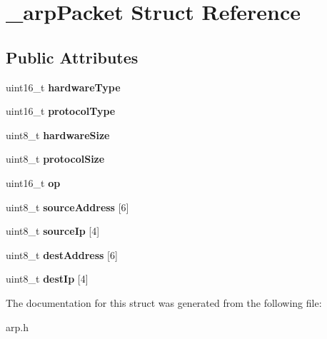 \hypertarget{struct__arpPacket}{}\section{\+\_\+arp\+Packet Struct Reference}
\label{struct__arpPacket}
\subsection*{Public Attributes}
\begin{DoxyCompactItemize}
\item 
\mbox{\label{struct__arpPacket_a839c94f50cb7173a20785682e441d948}} 
uint16\+\_\+t {\bfseries hardware\+Type}
\item 
\mbox{\label{struct__arpPacket_afad7356bbce2b911d8f6826872101e77}} 
uint16\+\_\+t {\bfseries protocol\+Type}
\item 
\mbox{\label{struct__arpPacket_a722bf3490b264b96540b94863c6a027d}} 
uint8\+\_\+t {\bfseries hardware\+Size}
\item 
\mbox{\label{struct__arpPacket_a5815bf18c947bc861ea70ac189ebd64f}} 
uint8\+\_\+t {\bfseries protocol\+Size}
\item 
\mbox{\label{struct__arpPacket_a6505d582c64aaa66531903b7b1677b51}} 
uint16\+\_\+t {\bfseries op}
\item 
\mbox{\label{struct__arpPacket_a2a92f5a13faefe488167039dba870ac6}} 
uint8\+\_\+t {\bfseries source\+Address} \mbox{[}6\mbox{]}
\item 
\mbox{\label{struct__arpPacket_ac403f730ac761759e99f7896c396b5d7}} 
uint8\+\_\+t {\bfseries source\+Ip} \mbox{[}4\mbox{]}
\item 
\mbox{\label{struct__arpPacket_a3c346f5b5af88ebe57adf3af73561fd4}} 
uint8\+\_\+t {\bfseries dest\+Address} \mbox{[}6\mbox{]}
\item 
\mbox{\label{struct__arpPacket_aff29f4d16913664389e708a89eb40510}} 
uint8\+\_\+t {\bfseries dest\+Ip} \mbox{[}4\mbox{]}
\end{DoxyCompactItemize}


The documentation for this struct was generated from the following file\+:\begin{DoxyCompactItemize}
\item 
arp.\+h\end{DoxyCompactItemize}
